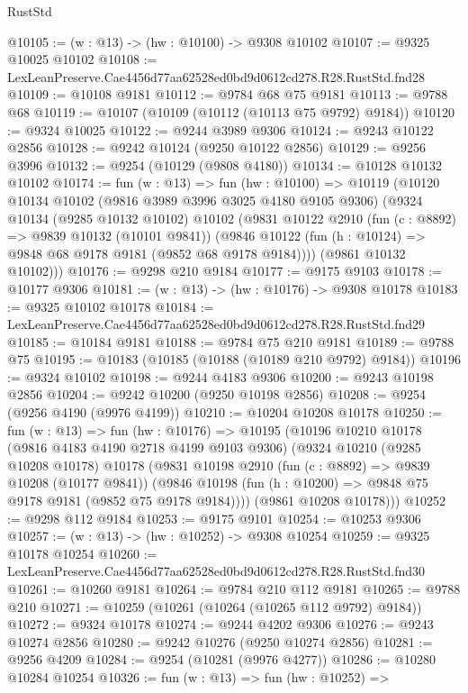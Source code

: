 \begin{lexlean}{RustStd}
\begin{coremodule}
@10105 := (w : @13) -> (hw : @10100) -> @9308 @10102
@10107 := @9325 @10025 @10102
@10108 := LexLeanPreserve.Cae4456d77aa62528ed0bd9d0612cd278.R28.RustStd.fnd28
@10109 := @10108 @9181
@10112 := @9784 @68 @75 @9181
@10113 := @9788 @68
@10119 := @10107 (@10109 (@10112 (@10113 @75 @9792) @9184))
@10120 := @9324 @10025
@10122 := @9244 @3989 @9306
@10124 := @9243 @10122 @2856
@10128 := @9242 @10124 (@9250 @10122 @2856)
@10129 := @9256 @3996
@10132 := @9254 (@10129 (@9808 @4180))
@10134 := @10128 @10132 @10102
@10174 := fun (w : @13) =>
  fun (hw : @10100) =>
  @10119
    (@10120
      @10134
      @10102
      (@9816 @3989 @3996 @3025 @4180 @9105 @9306)
      (@9324
        @10134
        (@9285 @10132 @10102)
        @10102
        (@9831
          @10122
          @2910
          (fun (c : @8892) => @9839 @10132 (@10101 @9841))
          (@9846 @10122 (fun (h : @10124) => @9848 @68 @9178 @9181 (@9852 @68 @9178 @9184))))
        (@9861 @10132 @10102)))
@10176 := @9298 @210 @9184
@10177 := @9175 @9103
@10178 := @10177 @9306
@10181 := (w : @13) -> (hw : @10176) -> @9308 @10178
@10183 := @9325 @10102 @10178
@10184 := LexLeanPreserve.Cae4456d77aa62528ed0bd9d0612cd278.R28.RustStd.fnd29
@10185 := @10184 @9181
@10188 := @9784 @75 @210 @9181
@10189 := @9788 @75
@10195 := @10183 (@10185 (@10188 (@10189 @210 @9792) @9184))
@10196 := @9324 @10102
@10198 := @9244 @4183 @9306
@10200 := @9243 @10198 @2856
@10204 := @9242 @10200 (@9250 @10198 @2856)
@10208 := @9254 (@9256 @4190 (@9976 @4199))
@10210 := @10204 @10208 @10178
@10250 := fun (w : @13) =>
  fun (hw : @10176) =>
  @10195
    (@10196
      @10210
      @10178
      (@9816 @4183 @4190 @2718 @4199 @9103 @9306)
      (@9324
        @10210
        (@9285 @10208 @10178)
        @10178
        (@9831
          @10198
          @2910
          (fun (c : @8892) => @9839 @10208 (@10177 @9841))
          (@9846 @10198 (fun (h : @10200) => @9848 @75 @9178 @9181 (@9852 @75 @9178 @9184))))
        (@9861 @10208 @10178)))
@10252 := @9298 @112 @9184
@10253 := @9175 @9101
@10254 := @10253 @9306
@10257 := (w : @13) -> (hw : @10252) -> @9308 @10254
@10259 := @9325 @10178 @10254
@10260 := LexLeanPreserve.Cae4456d77aa62528ed0bd9d0612cd278.R28.RustStd.fnd30
@10261 := @10260 @9181
@10264 := @9784 @210 @112 @9181
@10265 := @9788 @210
@10271 := @10259 (@10261 (@10264 (@10265 @112 @9792) @9184))
@10272 := @9324 @10178
@10274 := @9244 @4202 @9306
@10276 := @9243 @10274 @2856
@10280 := @9242 @10276 (@9250 @10274 @2856)
@10281 := @9256 @4209
@10284 := @9254 (@10281 (@9976 @4277))
@10286 := @10280 @10284 @10254
@10326 := fun (w : @13) =>
  fun (hw : @10252) =>

\end{coremodule}
\end{lexlean}
